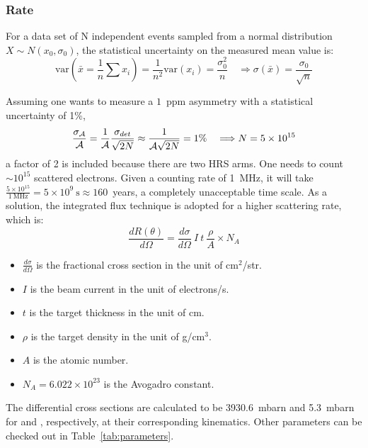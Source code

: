 \subsubsection{Rate}
For a data set of N independent events sampled from a normal distribution 
$X\sim N(x_0, \sigma_0)$, the statistical uncertainty on the measured mean value
is:
$$ \text{var}(\bar{x} = \frac{1}{n}\sum x_i) = \frac{1}{n^2}\text{var}(x_i) = \frac{\sigma_0^2}{n} 
\quad \Longrightarrow \sigma(\bar{x}) = \frac{\sigma_0}{\sqrt{n}} $$

Assuming one wants to measure a $1$~ppm asymmetry with a statistical uncertainty of 1\%,
\begin{equation}
    \frac{\sigma_{\mathcal{A}}}{\mathcal{A}} = \frac{1}{\mathcal{A}}\frac{\sigma_{det}}{\sqrt{2N}} 
    \approx \frac{1}{\mathcal{A}\sqrt{2N}} = 1\% \quad 
    \Longrightarrow N = 5 \times 10^{15} 
    \label{eq:statistical_error}
\end{equation}
a factor of 2 is included because there are two HRS arms.
One needs to count $\sim10^{15}$ scattered electrons. Given a counting rate of 1~MHz, 
it will take $\frac{5\times 10^{15}}{1\ \mathrm{MHz}} = 5\times 10^{9}\ \mathrm{s} \approx 160$~years,
a completely unacceptable time scale. As a solution, the integrated flux technique is
adopted for a higher scattering rate, which is:
\begin{equation}
    \frac{dR(\theta)}{d\Omega} = \frac{d\sigma}{d\Omega}\ I\ t\ \frac{\rho}{A} \times N_A   
\end{equation}
\begin{itemize}
    \item $\frac{d\sigma}{d\Omega}$ is the fractional cross section in the unit of $\mathrm{cm}^2$/str.
    \item $I$ is the beam current in the unit of electrons/s.
    \item $t$ is the target thickness in the unit of cm.
    \item $\rho$ is the target density in the unit of g/cm${}^3$.
    \item $A$ is the atomic number.
    \item $N_A = 6.022\times 10^{23}$ is the Avogadro constant.
\end{itemize}

The differential cross sections are calculated to be 3930.6~mbarn and 5.3~mbarn 
for \Pb and \Ca, respectively, at their corresponding kinematics. 
Other parameters can be checked out in Table~\ref{tab:parameters}.

